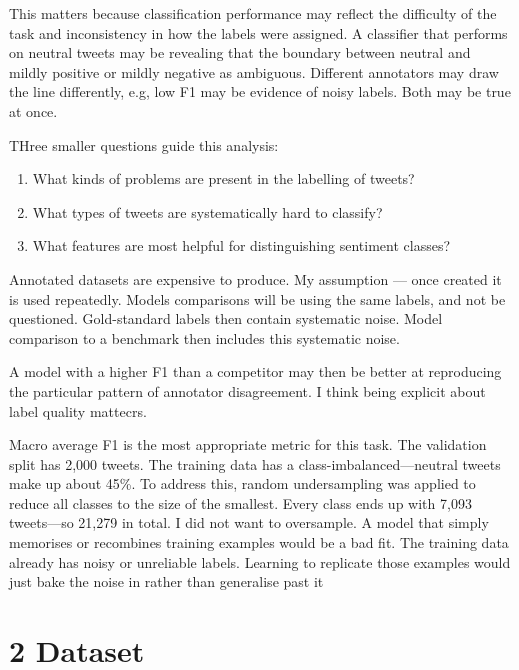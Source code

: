 \documentclass[12pt]{article}
\begin{document}
This matters because  classification performance may reflect  the difficulty of the task and inconsistency in how the labels were assigned. 
A classifier that performs  on neutral tweets may be revealing that the boundary 
between neutral and mildly positive or mildly negative as ambiguous.
Different annotators may draw the line differently,
 e.g, low F1 may be evidence of noisy labels. Both may be true at once.

THree smaller questions guide this analysis:

\begin{enumerate}

  \item What kinds of problems are present in the labelling of tweets?

  \item What types of tweets are systematically hard to classify?

  \item What features are most helpful for distinguishing sentiment classes?

  
\end{enumerate}

Annotated datasets are expensive to produce. 
My assumption ---
 once created it is used repeatedly. 
 Models comparisons will be using the same labels, and not be questioned. 
 Gold-standard labels  then contain systematic noise. 
Model comparison to a benchmark then includes this systematic noise. 
 
 A model with a higher F1 than a competitor may then
 be better at reproducing the particular pattern 
 of annotator disagreement. 
 I think being explicit about label quality mattecrs.

Macro average F1 is the most appropriate metric for this task. 
The validation split has 2,000 tweets. 
The training data has a class-imbalanced---neutral tweets make up about 45\%. 
To address this, random undersampling was applied to reduce all classes to the size of the smallest. Every class ends up with 7,093 tweets---so 21,279 in total. 
I did not want to oversample.
A model that simply memorises or recombines training examples would be a bad fit.
The training data already has noisy or unreliable labels. 
Learning to replicate those examples would just bake the noise in rather than generalise past it



\section*{2 Dataset}
\end{document}
